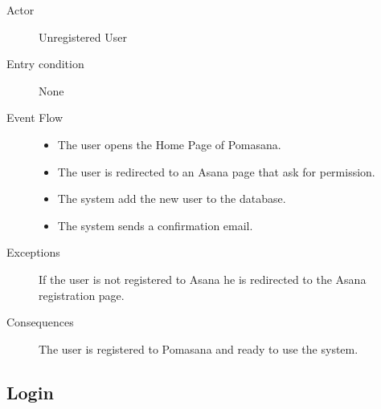 			\begin{description}

				\item[Actor] Unregistered User
			
				\item[Entry condition] None

				\item[Event Flow]\hfill

					\begin{itemize}

						\item The user opens the Home Page of Pomasana.

						\item The user is redirected to an Asana page that ask for permission.

						\item The system add the new user to the database.

						\item The system sends a confirmation email.

					\end{itemize}

				\item[Exceptions] If the user is not registered to Asana he is redirected to the Asana registration page.

				\item[Consequences] The user is registered to Pomasana and ready to use the system.

			\end{description}

		\subsection{Login}

